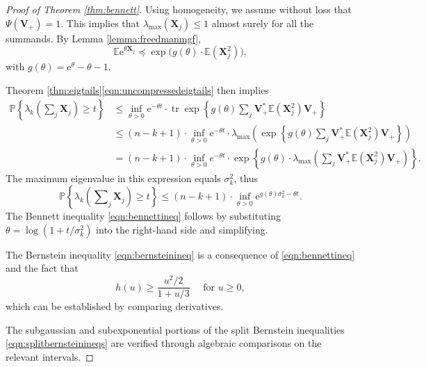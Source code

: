 \documentclass[11pt,letterpaper,twoside,reqno,nosumlimits]{amsart}
\renewcommand{\star}{*}
\newcommand{\mat}[1]{\ensuremath{\bm{#1}}} %
\newcommand{\e}{\ensuremath{\mathrm{e}}}
\newcommand{\E}{\ensuremath{\mathbb{E}}}
\newcommand{\Prob}[1]{\ensuremath{\mathbb{P}\left\{#1\right\}}}
\newcommand{\randcon}{\ensuremath{\Psi}}
\newcommand{\lambdamax}[1]{\ensuremath{\lambda_{\mathrm{max}}\left(#1\right)}}
\DeclareMathOperator{\tr}{tr}
\newcommand{\trexp}[1]{\ensuremath{\tr\exp\left\{#1\right\}}}
\theoremstyle{remark}
\numberwithin{equation}{section}
\numberwithin{thm}{section}
\numberwithin{prop}{section}
\numberwithin{defn}{section}
\numberwithin{remark}{section}
\begin{document}
\begin{proof}[Proof of Theorem \ref{thm:bennett}]
Using homogeneity, we assume without loss that $\randcon(\mat{V}_+)=1.$ This implies that $\lambdamax{\mat{X}_j} \leq 1$ almost surely for all the summands. By Lemma \ref{lemma:freedmanmgf},
\[
\E\e^{\theta \mat{X}_j} \preceq \exp\big( g(\theta) \cdot \E(\mat{X}_j^2) \big),
\]
with $g(\theta) = \e^\theta - \theta - 1.$ 

Theorem \ref{thm:eigtails}\eqref{eqn:uncompressedeigtails} then implies
\begin{align*}
\Prob{\lambda_k\left(\sum\nolimits_j \mat{X}_j \right) \geq t } & \leq \inf_{\theta > 0} \e^{-\theta t} \cdot \trexp{g(\theta) \sum\nolimits_j \mat{V}_{+}^\star\E (\mat{X}_j^2)\mat{V}_{+}} \\
 & \leq (n-k+1) \cdot \inf_{\theta >0} \e^{-\theta t} \cdot \lambdamax{\exp\left\{g(\theta)\sum\nolimits_j \mat{V}_{+}^\star\E(\mat{X}_j^2)\mat{V}_{+} \right\}} \\
& = (n-k+1) \cdot \inf_{\theta > 0} e^{-\theta t} \cdot \exp\left\{ g(\theta) \cdot \lambdamax{\sum\nolimits_j \mat{V}_{+}^\star\E(\mat{X}_j^2)\mat{V}_{+} } \right\}.
\end{align*}
The maximum eigenvalue in this expression equals $\sigma_k^2$, thus
\[ 
\Prob{\lambda_k\left(\sum\nolimits_j \mat{X}_j \right) \geq t} \leq (n-k+1) \cdot \inf_{\theta >0 } \e^{g(\theta) \sigma_k^2 -\theta t}.
\]
The Bennett inequality \eqref{eqn:bennettineq} follows by substituting $\theta = \log(1 + t/\sigma_k^2)$ into the right-hand side and simplifying.

The Bernstein inequality \eqref{eqn:bernsteinineq} is a consequence of \eqref{eqn:bennettineq} and the fact that 
\[
 h(u) \geq \frac{u^2/2}{1 + u/3} \quad \text{ for } u \geq 0,
\]
which can be established by comparing derivatives.

The subgaussian and subexponential portions of the split Bernstein inequalities \eqref{eqn:splitbernsteinineqs} are verified through algebraic comparisons on the relevant intervals.
\end{proof}
\end{document}
